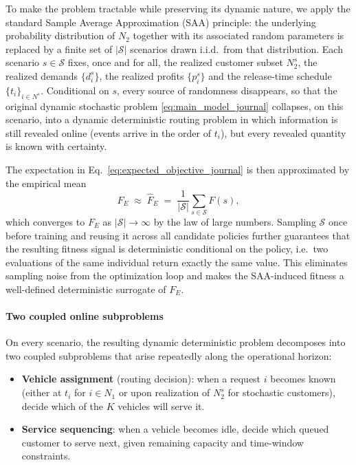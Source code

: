 \documentclass[pdflatex]{sn-jnl}
\begin{document}
To make the problem tractable while preserving its dynamic nature, we
apply the standard Sample Average Approximation (SAA)
principle: the underlying probability distribution of $N_2$ together
with its associated random parameters is replaced by a finite set of
$|\mathcal{S}|$ scenarios drawn i.i.d.\ from that distribution. Each
scenario $s\in\mathcal{S}$ fixes, once and for all, the realized
customer subset $N_2^s$, the realized demands $\{d_i^s\}$, the
realized profits $\{p_i^s\}$ and the release-time schedule
$\{t_i\}_{i\in N^s}$. Conditional on $s$, every source of randomness
disappears, so that the original dynamic stochastic problem
\eqref{eq:main_model_journal} collapses, on this scenario, into a
dynamic deterministic routing problem in which information is
still revealed online (events arrive in the order of $t_i$), but every
revealed quantity is known with certainty.

The expectation in
Eq.~\eqref{eq:expected_objective_journal} is then approximated by the
empirical mean
\begin{equation}
\label{eq:saa_objective}
F_E \;\approx\;
\widehat{F}_E
\;=\;
\frac{1}{|\mathcal{S}|}\sum_{s\in\mathcal{S}} F(s),
\end{equation}
which converges to $F_E$ as $|\mathcal{S}|\to\infty$ by the law of
large numbers. Sampling $\mathcal{S}$ once before training and reusing
it across all candidate policies further guarantees that the resulting
fitness signal is deterministic conditional on the policy,
i.e.\ two evaluations of the same individual return exactly the same
value. This eliminates sampling noise from the optimization loop and
makes the SAA-induced fitness a well-defined deterministic surrogate
of $F_E$.

\paragraph{Two coupled online subproblems}
On every scenario, the resulting dynamic deterministic problem
decomposes into two coupled subproblems that arise repeatedly along
the operational horizon:
\begin{itemize}
    \item \textbf{Vehicle assignment} (routing decision): when a
          request $i$ becomes known (either at $t_i$ for $i\in N_1$
          or upon realization of $N_2^s$ for stochastic
          customers), decide which of the $K$ vehicles will serve it.
    \item \textbf{Service sequencing}: when a vehicle becomes idle,
          decide which queued customer to serve next, given remaining
          capacity and time-window constraints.
\end{itemize}
\end{document}
